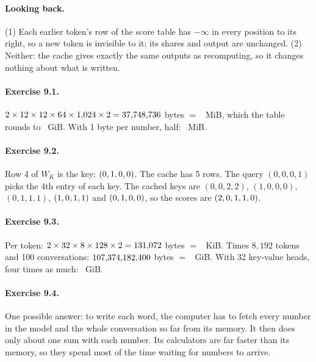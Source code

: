 \paragraph{Looking back.} (1) Each earlier token's row of the score table has $-\infty$ in every position to its
right, so a new token is invisible to it; its shares and output are unchanged. (2) Neither: the cache gives
exactly the same outputs as recomputing, so it changes nothing about what is written.

\paragraph{Exercise 9.1.} $2\times12\times12\times64\times1{,}024\times2 = 37{,}748{,}736$ bytes $=$ \nNineExOneMiB\ MiB,
which the table rounds to \nNineGptKvOne\ GiB. With 1 byte per number, half: \nNineExOneHalfMiB\ MiB.

\paragraph{Exercise 9.2.} Row 4 of $W_K$ is the key: $(0, 1, 0, 0)$. The cache has 5 rows.
The query $(0,0,0,1)$ picks the 4th entry of each key. The cached keys are $(0,0,2,2)$, $(1,0,0,0)$,
$(0,1,1,1)$, $(1, 0, 1, 1)$ and $(0, 1, 0, 0)$, so the scores are $(2, 0, 1, 1, 0)$.

\paragraph{Exercise 9.3.} Per token: $2\times32\times8\times128\times2 = 131{,}072$ bytes $=$ \nNineExThreeTokKiB\ KiB. Times
$8{,}192$ tokens and 100 conversations: $107{,}374{,}182{,}400$ bytes $=$ \nNineExThreeGiB\ GiB. With 32 key-value heads,
four times as much: \nNineExThreeMhaGiB\ GiB.

\paragraph{Exercise 9.4.} One possible answer: to write each word, the computer has to fetch every number in
the model and the whole conversation so far from its memory. It then does only about one sum with each number.
Its calculators are far faster than its memory, so they spend most of the time waiting for numbers to arrive.

